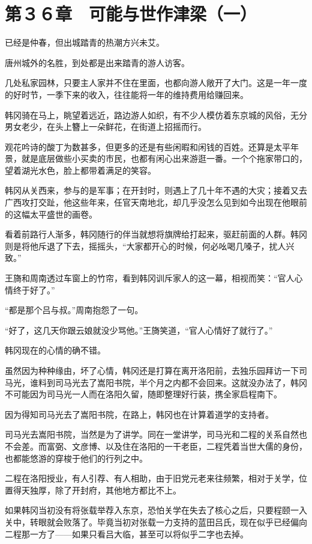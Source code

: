 \section{第３６章　可能与世作津梁（一）}

已经是仲春，但出城踏青的热潮方兴未艾。

唐州城外的名胜，到处都是出来踏青的游人访客。

几处私家园林，只要主人家并不住在里面，也都向游人敞开了大门。这是一年一度的好时节，一季下来的收入，往往能将一年的维持费用给赚回来。

韩冈骑在马上，眺望着远近，路边游人如织，有不少人模仿着东京城的风俗，无分男女老少，在头上簪上一朵鲜花，在街道上招摇而行。

观花吟诗的酸丁为数甚多，但更多的还是有些闲暇和闲钱的百姓。还算是太平年景，就是底层做些小买卖的市民，也都有闲心出来游逛一番。一个个拖家带口的，望着湖光水色，脸上都带着满足的笑容。

韩冈从关西来，参与的是军事；在开封时，则遇上了几十年不遇的大灾；接着又去广西攻打交趾，他这些年来，任官天南地北，却几乎没怎么见到如今出现在他眼前的这幅太平盛世的画卷。

看着前路行人渐多，韩冈随行的伴当就想将旗牌给打起来，驱赶前面的人群。韩冈则是将他斥退了下去，摇摇头，“大家都开心的时候，何必吆喝几嗓子，扰人兴致。”

王旖和周南透过车窗上的竹帘，看到韩冈训斥家人的这一幕，相视而笑：“官人心情终于好了。”

“都是那个吕与叔。”周南抱怨了一句。

“好了，这几天你跟云娘就没少骂他。”王旖笑道，“官人心情好了就行了。”

韩冈现在的心情的确不错。

虽然因为种种缘由，坏了心情，韩冈还是打算在离开洛阳前，去独乐园拜访一下司马光，谁料到司马光去了嵩阳书院，半个月之内都不会回来。这就没办法了，韩冈不可能因为司马光一人而在洛阳久留，随即整理好行装，携全家启程南下。

因为得知司马光去了嵩阳书院，在路上，韩冈也在计算着道学的支持者。

司马光去嵩阳书院，当然是为了讲学。同在一堂讲学，司马光和二程的关系自然也不会差。而富弼、文彦博、以及住在洛阳的一干老臣，二程凭着当世大儒的身份，也都能悠游的穿梭于他们的行列之中。

二程在洛阳授业，有人引荐、有人相助，由于旧党元老来往频繁，相对于关学，位置得天独厚，除了开封府，其他地方都比不上。

如果韩冈当初没有将张载举荐入东京，恐怕关学在失去了核心之后，只要程颐一入关中，转眼就会败落了。毕竟当初对张载一力支持的蓝田吕氏，现在似乎已经偏向二程那一方了——如果只看吕大临，甚至可以将似乎二字也去掉。

